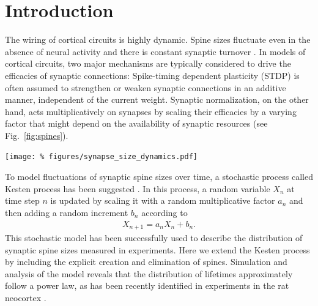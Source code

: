 \section{Introduction}
\vspace{-0.2cm}

The wiring of cortical circuits is highly dynamic. Spine sizes fluctuate even in the absence of neural activity and there is constant synaptic turnover \cite{Loewenstein2015}. In models of cortical circuits, two major mechanisms are typically considered to drive the efficacies of synaptic connections: Spike-timing dependent plasticity (STDP) is often assumed to strengthen or weaken synaptic connections in an additive manner, independent of the current weight. Synaptic normalization, on the other hand, acts multiplicatively on synapses by scaling their efficacies by a varying factor that might depend on the availability of synaptic resources \cite{Triesch2017} (see Fig.~\ref{fig:spines}).



\begin{center}\vspace{0.01cm}
  \texttt{[image: \%
    figures/synapse\_size\_dynamics.pdf]}
  \label{fig:spines}
\end{center}\vspace{2cm}


To model fluctuations of synaptic spine sizes over time, a stochastic process called Kesten process has been suggested \cite{Kesten1973, Statman2014}. In this process, a random variable $X_n$ at time step $n$ is updated by scaling it with a random multiplicative factor $a_n$ and then adding a random increment $b_n$ according to
%
\begin{align}
  X_{n+1} = a_n X_n + b_n. \label{eq:kesten}
\end{align}
%
This stochastic model has been successfully used to describe the distribution of synaptic spine sizes measured in experiments. Here we extend the Kesten process by including the explicit creation and elimination of spines. Simulation and analysis of the model reveals that the distribution of lifetimes approximately follow a power law, as has been recently identified in experiments in the rat neocortex \cite{Loewenstein2015}.


